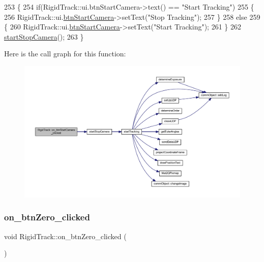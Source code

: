\begin{DoxyCode}
253 \{
254     \textcolor{keywordflow}{if}(RigidTrack::ui.btnStartCamera->text() == \textcolor{stringliteral}{"Start Tracking"})
255     \{
256         RigidTrack::ui.\hyperlink{class_ui___rigid_track_class_a72fc55bdb6021b52b9ec0e97e112d57d}{btnStartCamera}->setText(\textcolor{stringliteral}{"Stop Tracking"});
257     \}
258     \textcolor{keywordflow}{else}
259     \{
260         RigidTrack::ui.\hyperlink{class_ui___rigid_track_class_a72fc55bdb6021b52b9ec0e97e112d57d}{btnStartCamera}->setText(\textcolor{stringliteral}{"Start Tracking"});
261     \}
262     \hyperlink{main_8cpp_a25183e8d0b386ef12b557efc712a0261}{startStopCamera}();
263 \}
\end{DoxyCode}
Here is the call graph for this function\+:\nopagebreak
\begin{figure}[H]
\begin{center}
\leavevmode
\includegraphics[width=350pt]{class_rigid_track_a2f226856e28868c8bb1854fa16531f60_cgraph}
\end{center}
\end{figure}
\mbox{\label{class_rigid_track_afb1a4edcacc818db4ec6bb017dd07e0f}} 
\subsubsection{\texorpdfstring{on\+\_\+btn\+Zero\+\_\+clicked}{on\_btnZero\_clicked}}
{\footnotesize\ttfamily void Rigid\+Track\+::on\+\_\+btn\+Zero\+\_\+clicked (\begin{DoxyParamCaption}{ }\end{DoxyParamCaption})\hspace{0.3cm}{\ttfamily [slot]}}



